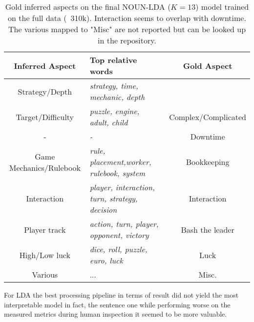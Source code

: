 \begin{center}

    \begin{table}
        \begin{tabular}{c l c}
            \hline
            Inferred Aspect         & Top relative words                                     & Gold Aspect \\ [0.5ex]
            \hline\hline
            Strategy/Depth          & \textit{strategy, time, mechanic, depth}               &                     \\
            Target/Difficulty       & \textit{puzzle, engine, adult, child}                  & Complex/Complicated \\
            \hline
            -                       & \textit{-}                                             & Downtime            \\
            \hline
            Game Mechanics/Rulebook & \textit{rule, placement,worker, rulebook, system}      & Bookkeeping         \\
            \hline
            Interaction             & \textit{player, interaction, turn, strategy, decision} & Interaction         \\
            \hline
            Player track            & \textit{action, turn, player, opponent, victory}       & Bash the leader     \\
            \hline
            High/Low luck           & \textit{dice, roll, puzzle, euro, luck}                & Luck                \\
            \hline
            Various                 & ...                                                    & Misc.               \\
            \hline
        \end{tabular}
        \caption{Gold inferred aspects on the final NOUN-LDA ($K=13$) model trained on the full data (~310k).
        Interaction seems to overlap with downtime.
        The various mapped to "Misc" are not reported but can be looked up in the repository.
        }
        \label{nounlda}

    \end{table}

\end{center}

For LDA the best processing pipeline in terms of result did not yield the most interpretable model in fact,
the sentence one while performing worse on the measured metrics during human inspection it seemed to be more valuable.

